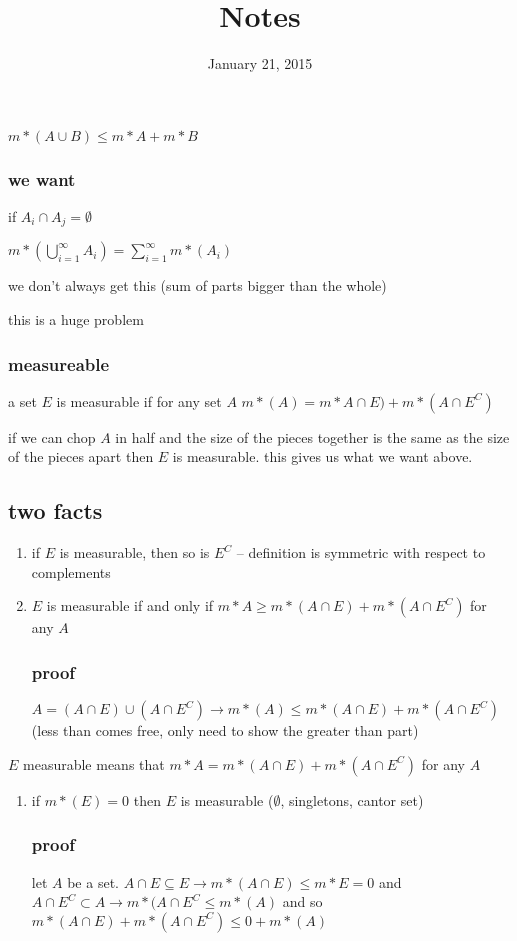 \documentclass[letterpaper]{article}
\begin{document}
\title{Notes}
\date{January 21, 2015}
\maketitle
$m*(A\cup B)\le m*A+m*B$

\subsubsection*{we want}
if $A_i\cap A_j=\emptyset$

$m*(\bigcup_{i=1}^\infty A_i)=\sum\limits_{i=1}^\infty{m*(A_i)}$

we don't always get this (sum of parts bigger than the whole)

this is a huge problem

\subsubsection*{measureable}
a set $E$ is measurable if for any  set $A$ $m*(A)=m*A\cap E)+m*(A\cap E^C)$

if we can chop $A$ in half and the size of the pieces together is the same as the size of the pieces apart then $E$ is measurable. this gives us what we want above.

\subsection*{two facts}
\begin{enumerate}
\item
if $E$ is measurable, then so is $E^C$ -- definition is symmetric with respect to complements
\item
$E$ is measurable if and only if $m*A\ge m*(A\cap E)+m*(A\cap E^C)$ for any $A$
\subsubsection*{proof}
$A=(A\cap E)\cup(A\cap E^C)\to m*(A)\le m*(A\cap E)+m*(A\cap E^C)$ (less than comes free, only need to show the greater than part)
\end{enumerate}

$E$ measurable means that $m*A=m*(A\cap E)+m*(A\cap E^C)$ for any $A$

\begin{enumerate}
\item
if $m*(E)=0$ then $E$ is measurable ($\emptyset$, singletons, cantor set)
\subsubsection*{proof}
let $A$ be a set. $A\cap E\subseteq E\to m*(A\cap E)\le m*E=0 $ and $A\cap E^C\subset A\to m*(A\cap E^C\le m*(A)$ and so $m*(A\cap E)+m*(A\cap E^C)\le 0+m*(A)$
\end{enumerate}
\end{document}
